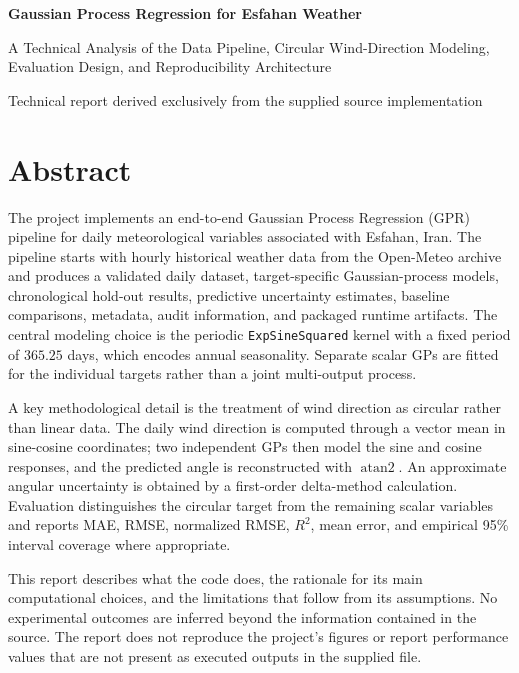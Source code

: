 \documentclass[11pt,a4paper]{article}
\newcommand{\code}[1]{\texttt{#1}}
\begin{document}
\begin{titlepage}
\centering
\vspace*{2.0cm}
{\LARGE\bfseries Gaussian Process Regression for Esfahan Weather\par}
\vspace{0.6cm}
{\large A Technical Analysis of the Data Pipeline, Circular Wind-Direction Modeling, Evaluation Design, and Reproducibility Architecture\par}
\vfill
{\large Technical report derived exclusively from the supplied source implementation\par}
\vspace*{1.4cm}
\end{titlepage}

\section*{Abstract}
The project implements an end-to-end Gaussian Process Regression (GPR) pipeline for daily meteorological variables associated with Esfahan, Iran. The pipeline starts with hourly historical weather data from the Open-Meteo archive and produces a validated daily dataset, target-specific Gaussian-process models, chronological hold-out results, predictive uncertainty estimates, baseline comparisons, metadata, audit information, and packaged runtime artifacts. The central modeling choice is the periodic \code{ExpSineSquared} kernel with a fixed period of $365.25$ days, which encodes annual seasonality. Separate scalar GPs are fitted for the individual targets rather than a joint multi-output process.

A key methodological detail is the treatment of wind direction as circular rather than linear data. The daily wind direction is computed through a vector mean in sine-cosine coordinates; two independent GPs then model the sine and cosine responses, and the predicted angle is reconstructed with \(\operatorname{atan2}\). An approximate angular uncertainty is obtained by a first-order delta-method calculation. Evaluation distinguishes the circular target from the remaining scalar variables and reports MAE, RMSE, normalized RMSE, $R^2$, mean error, and empirical 95\% interval coverage where appropriate.

This report describes what the code does, the rationale for its main computational choices, and the limitations that follow from its assumptions. No experimental outcomes are inferred beyond the information contained in the source. The report does not reproduce the project's figures or report performance values that are not present as executed outputs in the supplied file.
\end{document}
